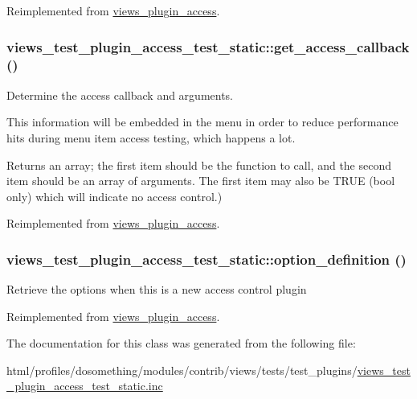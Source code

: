 Reimplemented from \hyperlink{classviews__plugin__access_ad24d38c1b1a1bd7527b2b96a2103cede}{views\_\-plugin\_\-access}.\hypertarget{classviews__test__plugin__access__test__static_a4ddfff64a5cccae83c64e4c89095aeb6}{
\subsubsection[{get\_\-access\_\-callback}]{\setlength{\rightskip}{0pt plus 5cm}views\_\-test\_\-plugin\_\-access\_\-test\_\-static::get\_\-access\_\-callback ()}}
\label{classviews__test__plugin__access__test__static_a4ddfff64a5cccae83c64e4c89095aeb6}
Determine the access callback and arguments.

This information will be embedded in the menu in order to reduce performance hits during menu item access testing, which happens a lot.

\begin{DoxyReturn}{Returns}
an array; the first item should be the function to call, and the second item should be an array of arguments. The first item may also be TRUE (bool only) which will indicate no access control.) 
\end{DoxyReturn}


Reimplemented from \hyperlink{classviews__plugin__access_ad4038a32fccc6a662a74f437d0bf6a23}{views\_\-plugin\_\-access}.\hypertarget{classviews__test__plugin__access__test__static_a5b36ae87f1e4d92e04d02bb946a15330}{
\subsubsection[{option\_\-definition}]{\setlength{\rightskip}{0pt plus 5cm}views\_\-test\_\-plugin\_\-access\_\-test\_\-static::option\_\-definition ()}}
\label{classviews__test__plugin__access__test__static_a5b36ae87f1e4d92e04d02bb946a15330}
Retrieve the options when this is a new access control plugin 

Reimplemented from \hyperlink{classviews__plugin__access_a3d52dc2603a2991a46a3c212a04097d2}{views\_\-plugin\_\-access}.

The documentation for this class was generated from the following file:\begin{DoxyCompactItemize}
\item 
html/profiles/dosomething/modules/contrib/views/tests/test\_\-plugins/\hyperlink{views__test__plugin__access__test__static_8inc}{views\_\-test\_\-plugin\_\-access\_\-test\_\-static.inc}\end{DoxyCompactItemize}

